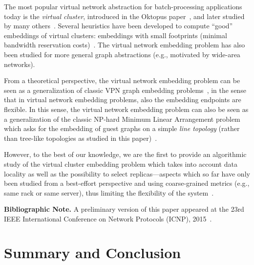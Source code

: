 \documentclass[preprint,12pt]{elsarticle}
\begin{document}
The most popular virtual network abstraction for batch-processing applications today is the \emph{virtual cluster},
introduced in the Oktopus paper~\cite{oktopus}, and later studied by many others~\cite{talk-about,ccr15emb,proteus}.
Several heuristics have been developed to compute ``good'' embeddings of virtual clusters: embeddings
with small footprints (minimal bandwidth reservation costs)~\cite{oktopus,talk-about,ccr15emb,proteus}.
The virtual network embedding problem has also been studied for more general graph abstractions
(e.g., motivated by wide-area networks).~\cite{boutaba-survey,fischer-survey}


From a theoretical perspective, the virtual network embedding problem can be seen as a generalization
of classic VPN graph embedding problems~\cite{Goyal2008,gupta2001provisioning},
in the sense that in virtual network embedding problems, also the embedding endpoints are flexible. In this sense, the virtual network embedding problem can also be seen as a generalization of the
classic NP-hard Minimum Linear Arrangement problem which asks for the
embedding of guest graphs on a simple \emph{line topology} (rather than tree-like topologies as
studied in this paper)~\cite{mla,mla-survey}.

However, to the best of our knowledge, we are the first to provide an algorithmic
study of the virtual cluster embedding problem which takes into account
data locality as well as the possibility to select replicas---aspects which so far have only
been studied from a best-effort perspective and using coarse-grained metrics (e.g., same rack or same server), thus limiting the flexibility of the
system~\cite{local-schedule-1,local-schedule-2,local-schedule-3}.

\noindent \textbf{Bibliographic Note.} A preliminary version of this paper appeared
at the 23rd IEEE International Conference on Network Protocols (ICNP), 2015~\cite{icnp15loc}.

\section{Summary and Conclusion}\label{sec:conclusion}
\end{document}
